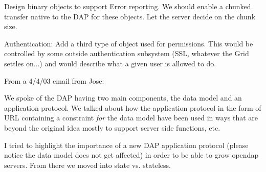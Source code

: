 Design binary objects to support Error reporting. We should enable a chunked
transfer native to the DAP for these objects. Let the server decide on the
chunk size.

Authentication: Add a third type of object used for permissions. This would
be controlled by some outside authentication subsystem (SSL, whatever the
Grid settles on...) and would describe what a given user is allowed to do.


From a 4/4/03 email from Jose:

We spoke of the DAP having two main components, the data model and an
application protocol. We talked about how the application protocol in
the form of URL containing a constraint \emph{for} the data model have been
used in ways that are beyond the original idea mostly to support server
side functions, etc.

I tried to highlight the importance of a new DAP application protocol
(please notice the data model does not get affected) in order to be able
to grow opendap servers. From there we moved into state
vs. stateless.

%
%
%
%
%

